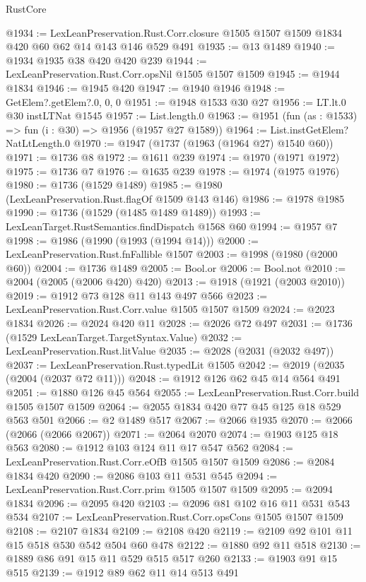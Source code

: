 \begin{lexlean}{RustCore}
\begin{coremodule}
@1934 := LexLeanPreservation.Rust.Corr.closure
    @1505
    @1507
    @1509
    @1834
    @420
    @60
    @62
    @14
    @143
    @146
    @529
    @491
@1935 := @13 @1489
@1940 := @1934 @1935 @38 @420 @420 @239
@1944 := LexLeanPreservation.Rust.Corr.opsNil @1505 @1507 @1509
@1945 := @1944 @1834
@1946 := @1945 @420
@1947 := @1940 @1946
@1948 := GetElem?.getElem?.{0, 0, 0}
@1951 := @1948 @1533 @30 @27
@1956 := LT.lt.{0} @30 instLTNat @1545
@1957 := List.length.{0}
@1963 := @1951 (fun (as : @1533) => fun (i : @30) => @1956 (@1957 @27 @1589))
@1964 := List.instGetElem?NatLtLength.{0}
@1970 := @1947 (@1737 (@1963 (@1964 @27) @1540 @60))
@1971 := @1736 @8
@1972 := @1611 @239
@1974 := @1970 (@1971 @1972)
@1975 := @1736 @7
@1976 := @1635 @239
@1978 := @1974 (@1975 @1976)
@1980 := @1736 (@1529 @1489)
@1985 := @1980 (LexLeanPreservation.Rust.flagOf @1509 @143 @146)
@1986 := @1978 @1985
@1990 := @1736 (@1529 (@1485 @1489 @1489))
@1993 := LexLeanTarget.RustSemantics.findDispatch @1568 @60
@1994 := @1957 @7
@1998 := @1986 (@1990 (@1993 (@1994 @14)))
@2000 := LexLeanPreservation.Rust.fnFallible @1507
@2003 := @1998 (@1980 (@2000 @60))
@2004 := @1736 @1489
@2005 := Bool.or
@2006 := Bool.not
@2010 := @2004 (@2005 (@2006 @420) @420)
@2013 := @1918 (@1921 (@2003 @2010))
@2019 := @1912 @73 @128 @11 @143 @497 @566
@2023 := LexLeanPreservation.Rust.Corr.value @1505 @1507 @1509
@2024 := @2023 @1834
@2026 := @2024 @420 @11
@2028 := @2026 @72 @497
@2031 := @1736 (@1529 LexLeanTarget.TargetSyntax.Value)
@2032 := LexLeanPreservation.Rust.litValue
@2035 := @2028 (@2031 (@2032 @497))
@2037 := LexLeanPreservation.Rust.typedLit @1505
@2042 := @2019 (@2035 (@2004 (@2037 @72 @11)))
@2048 := @1912 @126 @62 @45 @14 @564 @491
@2051 := @1880 @126 @45 @564
@2055 := LexLeanPreservation.Rust.Corr.build @1505 @1507 @1509
@2064 := @2055 @1834 @420 @77 @45 @125 @18 @529 @563 @501
@2066 := @2 @1489 @517
@2067 := @2066 @1935
@2070 := @2066 (@2066 (@2066 @2067))
@2071 := @2064 @2070
@2074 := @1903 @125 @18 @563
@2080 := @1912 @103 @124 @11 @17 @547 @562
@2084 := LexLeanPreservation.Rust.Corr.eOfB @1505 @1507 @1509
@2086 := @2084 @1834 @420
@2090 := @2086 @103 @11 @531 @545
@2094 := LexLeanPreservation.Rust.Corr.prim @1505 @1507 @1509
@2095 := @2094 @1834
@2096 := @2095 @420
@2103 := @2096 @81 @102 @16 @11 @531 @543 @534
@2107 := LexLeanPreservation.Rust.Corr.opsCons @1505 @1507 @1509
@2108 := @2107 @1834
@2109 := @2108 @420
@2119 := @2109 @92 @101 @11 @15 @518 @530 @542 @504 @60 @478
@2122 := @1880 @92 @11 @518
@2130 := @1889 @86 @91 @15 @11 @529 @515 @517 @260
@2133 := @1903 @91 @15 @515
@2139 := @1912 @89 @62 @11 @14 @513 @491

\end{coremodule}
\end{lexlean}
